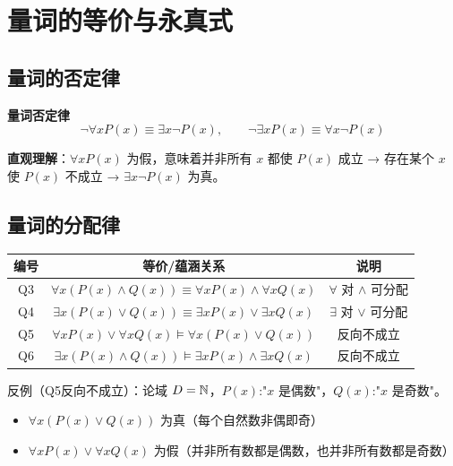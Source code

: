 \section{量词的等价与永真式}

\subsection{量词的否定律}

\begin{myformula}
\textbf{量词否定律}
\[
\neg\forall x P(x) \equiv \exists x \neg P(x),\qquad
\neg\exists x P(x) \equiv \forall x \neg P(x)
\]
\end{myformula}

\textbf{直观理解}：$\forall x P(x)$ 为假，意味着并非所有 $x$ 都使 $P(x)$ 成立 → 存在某个 $x$ 使 $P(x)$ 不成立 → $\exists x \neg P(x)$ 为真。

\subsection{量词的分配律}

\begin{center}
\begin{tabular}{c|c|c}
\toprule
编号 & 等价/蕴涵关系 & 说明 \\
\midrule
Q3 & $\forall x (P(x) \land Q(x)) \equiv \forall x P(x) \land \forall x Q(x)$ & $\forall$ 对 $\land$ 可分配 \\
Q4 & $\exists x (P(x) \lor Q(x)) \equiv \exists x P(x) \lor \exists x Q(x)$ & $\exists$ 对 $\lor$ 可分配 \\
Q5 & $\forall x P(x) \lor \forall x Q(x) \models \forall x (P(x) \lor Q(x))$ & 反向不成立 \\
Q6 & $\exists x (P(x) \land Q(x)) \models \exists x P(x) \land \exists x Q(x)$ & 反向不成立 \\
\bottomrule
\end{tabular}
\end{center}

\begin{example}
反例（Q5反向不成立）：论域 $D=\mathbb{N}$，$P(x)$:"$x$ 是偶数"，$Q(x)$:"$x$ 是奇数"。
\begin{itemize}
\item $\forall x (P(x) \lor Q(x))$ 为真（每个自然数非偶即奇）
\item $\forall x P(x) \lor \forall x Q(x)$ 为假（并非所有数都是偶数，也并非所有数都是奇数）
\end{itemize}
\end{example}

